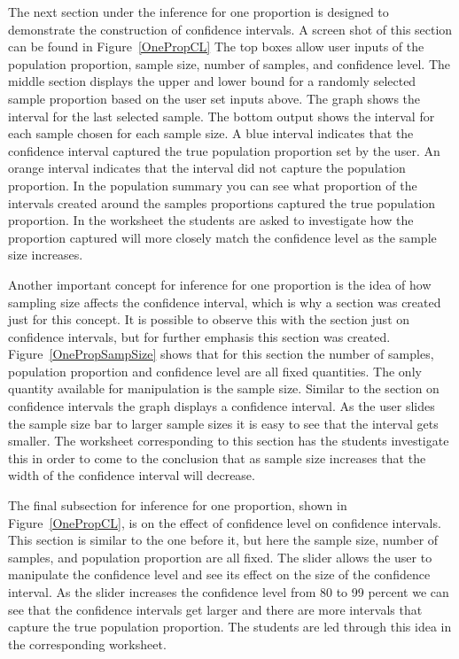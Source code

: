 \documentclass[11pt]{book}
\begin{document}
 


The next section under the inference for one proportion is designed to demonstrate the construction of confidence intervals. A screen shot of this section can be found in Figure~\ref{OnePropCL} The top boxes allow user inputs of the population proportion, sample size, number of samples, and confidence level.  The middle section displays the upper and lower bound for a randomly selected sample proportion based on the user set inputs above. The graph shows the interval for the last selected sample.  The bottom output shows the interval for each sample chosen for each sample size.  A blue interval indicates that the confidence interval captured the true population proportion set by the user.  An orange interval indicates that the interval did not capture the population proportion.  In the population summary you can see what proportion of the intervals created around the samples proportions captured the true population proportion.  In the worksheet the students are asked to investigate how the proportion captured will more closely match the confidence level as the sample size increases.  

Another important concept for inference for one proportion is the idea of how sampling size affects the confidence interval, which is why a section was created just for this concept.  It is possible to observe this with the section just on confidence intervals, but for further emphasis this section was created. Figure~\ref{OnePropSampSize} shows that for this section the number of samples, population proportion and confidence level are all fixed quantities.  The only quantity available for manipulation is the sample size.  Similar to the section on confidence intervals the graph displays a confidence interval.  As the user slides the sample size bar to larger sample sizes it is easy to see that the interval  gets  smaller.  The worksheet corresponding to this section has the students investigate this in order to come to the conclusion that as sample size increases that the width of the confidence interval will decrease.


The final subsection for inference for one proportion, shown in Figure~\ref{OnePropCL}, is on the effect of confidence level on confidence intervals.  This section is similar to the one before it, but here the sample size, number of samples, and population proportion are all fixed.  The slider allows the user to manipulate the confidence level and see its effect on the size of the confidence interval.  As the slider increases the confidence level from 80 to 99 percent we can see that the confidence intervals get larger and there are more intervals that capture the true population proportion.  The students are led through this idea in the corresponding worksheet.   
\end{document}
